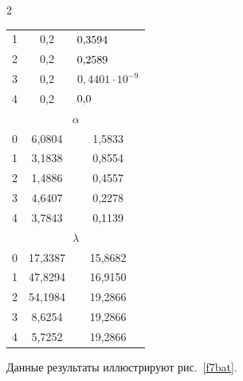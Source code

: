 \begin{multicols}{2}
\begin{table}
\begin{minipage}[t]{76mm}
\begin{center}
\begin{tabular}{|c|c|c|}
1&0,2&$0{,}3594\hphantom{{}\cdot 10^{-9}}$\\


2&0,2&$0{,}2589\hphantom{{}\cdot 10^{-9}}$\\


3&0,2&$0{,}4401\cdot 10^{-9}$\\


4&0,2&$0{,}0\hphantom{{}\cdot 10^{-9}999}$\\


\hline


\multicolumn{3}{|c|}{$\alpha$}\\


\hline


0&6,0804&1,5833\\


1&3,1838&0,8554\\


2&1,4886&0,4557\\


3&4,6407&0,2278\\


4&3,7843&0,1139\\


\hline


\multicolumn{3}{|c|}{$\lambda$}\\


\hline


0&17,3387&15,8682\\


1&47,8294&16,9150\\


2&54,1984&19,2866\\


3&\hphantom{1}8,6254&19,2866\\


4&\hphantom{1}5,7252&19,2866\\


\hline


\end{tabular}


\end{center}


\end{minipage}


\end{table}








Данные результаты иллюстрируют рис.~\ref{f7bat}.









\end{multicols}
